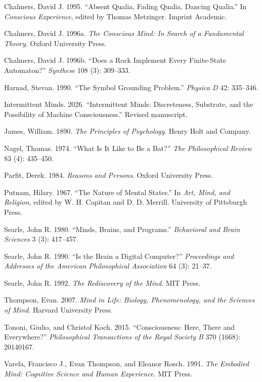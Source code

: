 \documentclass[11pt]{article}
\begin{document}
Chalmers, David J. 1995. ``Absent Qualia, Fading Qualia, Dancing Qualia.'' In \emph{Conscious Experience}, edited by Thomas Metzinger. Imprint Academic.

Chalmers, David J. 1996a. \emph{The Conscious Mind: In Search of a Fundamental Theory}. Oxford University Press.

Chalmers, David J. 1996b. ``Does a Rock Implement Every Finite-State Automaton?'' \emph{Synthese} 108 (3): 309--333.

Harnad, Stevan. 1990. ``The Symbol Grounding Problem.'' \emph{Physica D} 42: 335--346.

Intermittent Minds. 2026. ``Intermittent Minds: Discreteness, Substrate, and the Possibility of Machine Consciousness.'' Revised manuscript.

James, William. 1890. \emph{The Principles of Psychology}. Henry Holt and Company.

Nagel, Thomas. 1974. ``What Is It Like to Be a Bat?'' \emph{The Philosophical Review} 83 (4): 435--450.

Parfit, Derek. 1984. \emph{Reasons and Persons}. Oxford University Press.

Putnam, Hilary. 1967. ``The Nature of Mental States.'' In \emph{Art, Mind, and Religion}, edited by W. H. Capitan and D. D. Merrill. University of Pittsburgh Press.

Searle, John R. 1980. ``Minds, Brains, and Programs.'' \emph{Behavioral and Brain Sciences} 3 (3): 417--457.

Searle, John R. 1990. ``Is the Brain a Digital Computer?'' \emph{Proceedings and Addresses of the American Philosophical Association} 64 (3): 21--37.

Searle, John R. 1992. \emph{The Rediscovery of the Mind}. MIT Press.

Thompson, Evan. 2007. \emph{Mind in Life: Biology, Phenomenology, and the Sciences of Mind}. Harvard University Press.

Tononi, Giulio, and Christof Koch. 2015. ``Consciousness: Here, There and Everywhere?'' \emph{Philosophical Transactions of the Royal Society B} 370 (1668): 20140167.

Varela, Francisco J., Evan Thompson, and Eleanor Rosch. 1991. \emph{The Embodied Mind: Cognitive Science and Human Experience}. MIT Press.
\end{document}
